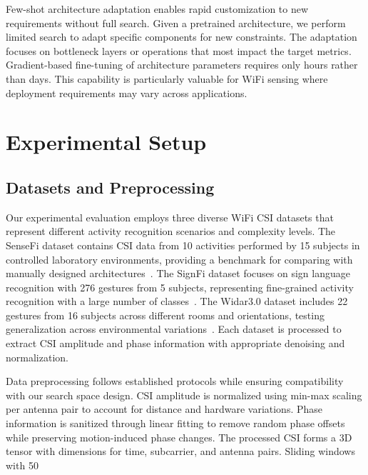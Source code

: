 \documentclass[journal]{IEEEtran}
\begin{document}
Few-shot architecture adaptation enables rapid customization to new requirements without full search. Given a pretrained architecture, we perform limited search to adapt specific components for new constraints. The adaptation focuses on bottleneck layers or operations that most impact the target metrics. Gradient-based fine-tuning of architecture parameters requires only hours rather than days. This capability is particularly valuable for WiFi sensing where deployment requirements may vary across applications.

\section{Experimental Setup}

\subsection{Datasets and Preprocessing}

Our experimental evaluation employs three diverse WiFi CSI datasets that represent different activity recognition scenarios and complexity levels. The SenseFi dataset contains CSI data from 10 activities performed by 15 subjects in controlled laboratory environments, providing a benchmark for comparing with manually designed architectures~\cite{sensefi2023}. The SignFi dataset focuses on sign language recognition with 276 gestures from 5 subjects, representing fine-grained activity recognition with a large number of classes~\cite{signfi2019}. The Widar3.0 dataset includes 22 gestures from 16 subjects across different rooms and orientations, testing generalization across environmental variations~\cite{widar2019}. Each dataset is processed to extract CSI amplitude and phase information with appropriate denoising and normalization.

Data preprocessing follows established protocols while ensuring compatibility with our search space design. CSI amplitude is normalized using min-max scaling per antenna pair to account for distance and hardware variations. Phase information is sanitized through linear fitting to remove random phase offsets while preserving motion-induced phase changes. The processed CSI forms a 3D tensor with dimensions for time, subcarrier, and antenna pairs. Sliding windows with 50%
\end{document}
